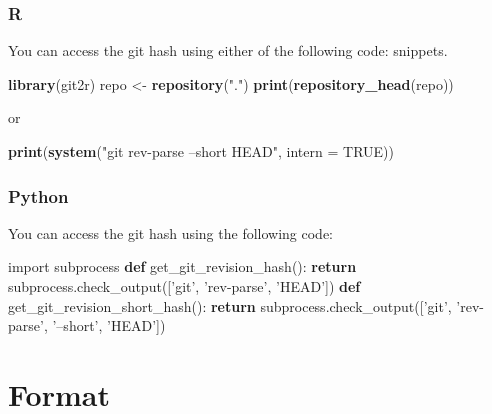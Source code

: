 \documentclass[]{book}
\newenvironment{Shaded}{\begin{snugshade}}{\end{snugshade}}
\newcommand{\ControlFlowTok}[1]{\textcolor[rgb]{0.13,0.29,0.53}{\textbf{#1}}}
\newcommand{\DataTypeTok}[1]{\textcolor[rgb]{0.13,0.29,0.53}{#1}}
\newcommand{\ImportTok}[1]{#1}
\newcommand{\KeywordTok}[1]{\textcolor[rgb]{0.13,0.29,0.53}{\textbf{#1}}}
\newcommand{\NormalTok}[1]{#1}
\newcommand{\OtherTok}[1]{\textcolor[rgb]{0.56,0.35,0.01}{#1}}
\newcommand{\StringTok}[1]{\textcolor[rgb]{0.31,0.60,0.02}{#1}}
\begin{document}
\hypertarget{r}{%
\subsubsection*{R}\label{r}}

You can access the git hash using either of the following code:
snippets.

\begin{Shaded}
\begin{Highlighting}[]
\KeywordTok{library}\NormalTok{(git2r)}
\NormalTok{repo <-}\StringTok{ }\KeywordTok{repository}\NormalTok{(}\StringTok{"."}\NormalTok{)}
\KeywordTok{print}\NormalTok{(}\KeywordTok{repository_head}\NormalTok{(repo))}
\end{Highlighting}
\end{Shaded}

or

\begin{Shaded}
\begin{Highlighting}[]
\KeywordTok{print}\NormalTok{(}\KeywordTok{system}\NormalTok{(}\StringTok{"git rev-parse --short HEAD"}\NormalTok{, }\DataTypeTok{intern =} \OtherTok{TRUE}\NormalTok{))}
\end{Highlighting}
\end{Shaded}

\hypertarget{python}{%
\subsubsection*{Python}\label{python}}

You can access the git hash using the following code:

\begin{Shaded}
\begin{Highlighting}[]
\ImportTok{import}\NormalTok{ subprocess}
\KeywordTok{def}\NormalTok{ get_git_revision_hash():}
    \ControlFlowTok{return}\NormalTok{ subprocess.check_output([}\StringTok{'git'}\NormalTok{, }\StringTok{'rev-parse'}\NormalTok{, }\StringTok{'HEAD'}\NormalTok{])}
\KeywordTok{def}\NormalTok{ get_git_revision_short_hash():}
    \ControlFlowTok{return}\NormalTok{ subprocess.check_output([}\StringTok{'git'}\NormalTok{, }\StringTok{'rev-parse'}\NormalTok{, }\StringTok{'--short'}\NormalTok{, }\StringTok{'HEAD'}\NormalTok{])}
\end{Highlighting}
\end{Shaded}

\hypertarget{format}{%
\section{Format}\label{format}}
\end{document}
